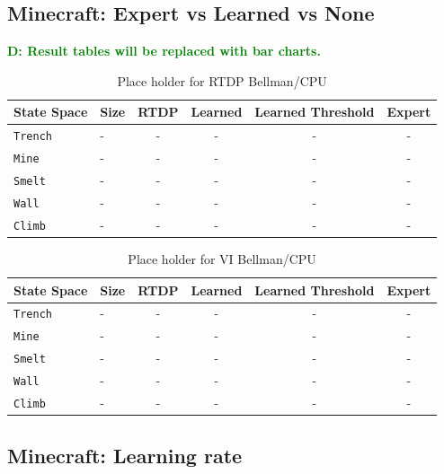 \documentclass[conference]{IEEEtran}
\newcommand{\dnote}[1]{\textcolor{Green}{\textbf{D: #1}}}
\begin{document}
\subsection{Minecraft: Expert vs Learned vs None}

\dnote{Result tables will be replaced with bar charts.}

\begin{table}[H]
\centering
\begin{tabular}{ l  l || c c c c }
  State Space 		&	Size 	&	RTDP 	& Learned & Learned Threshold & Expert 	\\ \hline
  \texttt{Trench}  	& 	-	&	-		&	-	&	-			&	-	\\
  \texttt{Mine}  		& 	-	&	-		&	-	&	-  			&	-	\\
  \texttt{Smelt}  		& 	-	&	-		&	-	&	-  			&	-	\\
  \texttt{Wall}  		& 	-	&	-		&	-	&	-			&	-	\\
  \texttt{Climb}  		& 	-	&	-		&	-	&	- 			&	-	\\
\end{tabular}
\caption{Place holder for RTDP Bellman/CPU}
\label{table:minecraft_results_bellman}
\end{table}

\begin{table}[H]
\centering
\begin{tabular}{ l l || c c c c }
  State Space 		&	Size 	&	RTDP 	& Learned & Learned Threshold & Expert 	\\ \hline
  \texttt{Trench}  	& 	-	&	-		&	-	&	-			&	-	\\
  \texttt{Mine}  		& 	-	&	-		&	-	&	-  			&	-	\\
  \texttt{Smelt}  		& 	-	&	-		&	-	&	-  			&	-	\\
  \texttt{Wall}  		& 	-	&	-		&	-	&	-			&	-	\\
  \texttt{Climb}  		& 	-	&	-		&	-	&	- 			&	-	\\
\end{tabular}
\caption{Place holder for VI Bellman/CPU}
\label{table:minecraft_results_bellman}
\end{table}

\subsection{Minecraft: Learning rate}
\end{document}
